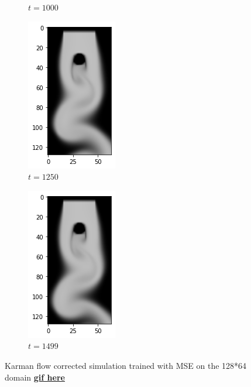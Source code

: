 \documentclass[a4paper,12pt,twoside]{report}
\begin{document}
\begin{figure}
\begin{subfigure}{0.18\textwidth}
		\caption{$t=1000$}
	\end{subfigure}
	\begin{subfigure}{0.18\textwidth}
		\centering
		\includegraphics[scale=0.5]{karmanflow/mse_density_001250.png}
		\caption{$t=1250$}
	\end{subfigure}
	\begin{subfigure}{0.18\textwidth}
		\centering
		\includegraphics[scale=0.5]{karmanflow/mse_density_001499.png}
		\caption{$t=1499$}
	\end{subfigure}
	\caption{Karman flow corrected simulation trained with MSE on the 128*64 domain \href{https://github.com/w191444052/sol-data/blob/master/karman_high/mse.gif}{\bf{gif here}}}
	\label{sol karman high mse}
\end{figure}
\end{document}
